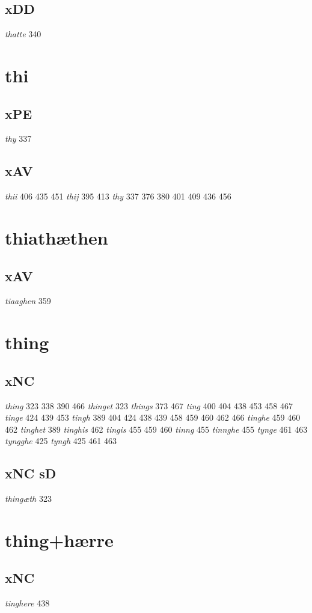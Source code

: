 \documentclass[a4paper,twocolumn]{article}
\begin{document}
\subsection{xDD}
\label{sec:org34ee261}
\emph{thatte} 340 
\section{thi}
\label{sec:org6824e94}
\subsection{xPE}
\label{sec:org31a2f51}
\emph{thy} 337 
\subsection{xAV}
\label{sec:org4f34a1e}
\emph{thii} 406 435 451 \emph{thij} 395 413 \emph{thy} 337 376 380 401 409 436 456 
\section{thiathæthen}
\label{sec:org584de40}
\subsection{xAV}
\label{sec:org6a8b550}
\emph{tiaaghen} 359 
\section{thing}
\label{sec:org014844b}
\subsection{xNC}
\label{sec:org67dae01}
\emph{thing} 323 338 390 466 \emph{thinget} 323 \emph{things} 373 467 \emph{ting} 400 404 438 453 458 467 \emph{tinge} 424 439 453 \emph{tingh} 389 404 424 438 439 458 459 460 462 466 \emph{tinghe} 459 460 462 \emph{tinghet} 389 \emph{tinghis} 462 \emph{tingis} 455 459 460 \emph{tinng} 455 \emph{tinnghe} 455 \emph{tynge} 461 463 \emph{tyngghe} 425 \emph{tyngh} 425 461 463 
\subsection{xNC sD}
\label{sec:org4b0ec26}
\emph{thingæth} 323 
\section{thing+hærre}
\label{sec:org5b100cc}
\subsection{xNC}
\label{sec:org49638e2}
\emph{tinghere} 438 
\end{document}
